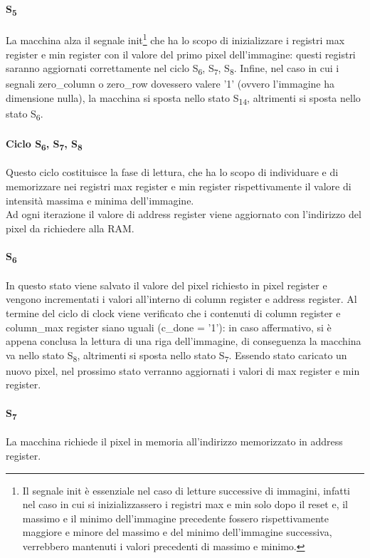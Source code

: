\paragraph{S\textsubscript{5}}
La macchina alza il segnale init\footnote{Il segnale init è essenziale nel caso di letture successive di immagini, infatti nel caso in cui si inizializzassero i registri max e min solo dopo il reset e, il massimo e il minimo dell'immagine precedente fossero rispettivamente maggiore e minore del massimo e del minimo dell'immagine successiva, verrebbero mantenuti i valori precedenti di massimo e minimo.} che ha lo scopo di inizializzare i registri max register e min register con il valore del primo pixel dell'immagine: questi registri saranno aggiornati correttamente nel ciclo S\textsubscript{6}, S\textsubscript{7}, S\textsubscript{8}.
Infine, nel caso in cui i segnali zero\_column o zero\_row dovessero valere '1' (ovvero l'immagine ha dimensione nulla), la macchina si sposta nello stato S\textsubscript{14}, altrimenti si sposta nello stato S\textsubscript{6}.
\paragraph{Ciclo S\textsubscript{6}, S\textsubscript{7}, S\textsubscript{8}}
Questo ciclo costituisce la fase di lettura, che ha lo scopo di individuare e di memorizzare nei registri max register e min register rispettivamente il valore di intensità massima e minima dell'immagine.\\
Ad ogni iterazione il valore di address register viene aggiornato con l'indirizzo del pixel da richiedere alla RAM.
\paragraph{S\textsubscript{6}}
In questo stato viene salvato il valore del pixel richiesto in pixel register e vengono incrementati i valori all'interno di column register e address register. Al termine del ciclo di clock viene verificato che i contenuti di column register e column\_max register siano uguali (c\_done = '1'): in caso affermativo, si è appena conclusa la lettura di una riga dell'immagine, di conseguenza la macchina va nello stato S\textsubscript{8}, altrimenti si sposta nello stato S\textsubscript{7}.
Essendo stato caricato un nuovo pixel, nel prossimo stato verranno aggiornati i valori di max register e min register.
\paragraph{S\textsubscript{7}}
La macchina richiede il pixel in memoria all'indirizzo memorizzato in address register.
